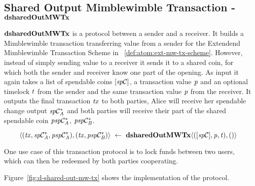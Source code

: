 \subsection{Shared Output Mimblewimble Transaction - $\mathbf{dsharedOutMWTx}$} \label{subsec:atom:shared-out-mw-tx}

$\mathbf{dsharedOutMWTx}$ is a protocol between a sender and a receiver.
It builds a Mimblewimble transaction transferring value from a sender for the Extendend Mimblewimble Transaction Scheme in ~\cref{def:atom:ext-mw-tx-scheme}.
However, instead of simply sending value to a receiver it sends it to a shared coin, for which both the sender and receiver know one part of the opening.
As input it again takes a list of spendable coins $[\mathit{sp}\mathcal{C}]$, a transaction value $\mathit{p}$ and an optional timelock $\mathit{t}$ from the sender and the same transaction value $\mathit{p}$ from the receiver.
It outputs the final transaction $\mathit{tx}$ to both parties, Alice will receive her spendable change output $\mathit{sp}\mathcal{C}_{\mathit{A}}^*$ and both parties will receive their part of the shared spendable coin $\mathit{psp}\mathcal{C}_{\mathit{A}}^*$, $\mathit{psp}\mathcal{C}_{\mathit{B}}^*$.

\[ \langle (\mathit{tx}, \mathit{sp}\mathcal{C}_{\mathit{A}}^*, \mathit{psp}\mathcal{C}_{\mathit{A}}^*), (\mathit{tx}, \mathit{psp}\mathcal{C}_{\mathit{B}}^*) \rangle ~\leftarrow~ \mathbf{dsharedOutMWTx} \langle([\mathit{sp}\mathcal{C}],\mathit{p},\mathit{t}), () \rangle \]

One use case of this transaction protocol is to lock funds between two users, which can then be redeemed by both parties cooperating.

Figure~\cref{fig:d-shared-out-mw-tx} shows the implementation of the protocol.

